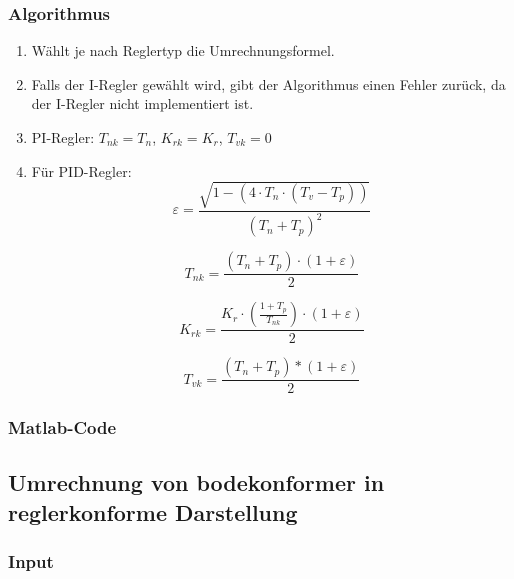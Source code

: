 \subsubsection*{Algorithmus}
\begin{enumerate}
    \item
        W\"ahlt je nach Reglertyp die Umrechnungsformel.
    \item
        Falls der I-Regler gew\"ahlt wird, gibt der Algorithmus einen Fehler zur\"uck, da der I-Regler nicht implementiert ist.
    \item
        PI-Regler:
        $T_{nk} = T_n$, $K_{rk} = K_r$, $T_{vk} = 0$
    \item
        F\"ur PID-Regler:
        \begin{equation*}
            \varepsilon =\frac{\sqrt{1-(4 \cdot T_n \cdot (T_v-T_p))}}{(T_n+T_p)^2}
        \end{equation*}

        \begin{equation*}
            T_{nk} = \frac{(T_n+T_p) \cdot (1+\varepsilon)}{2}
        \end{equation*}

        \begin{equation*}
            K_{rk} = \frac{K_r \cdot (\frac{1+T_p}{T_{nk}}) \cdot (1+\varepsilon)}{2}
        \end{equation*}

        \begin{equation*}
            T_{vk} = \frac{(T_n+T_p)*(1+\varepsilon)}{2}
        \end{equation*}
\end{enumerate}
\subsubsection*{Matlab-Code}



\subsection{Umrechnung von bodekonformer in reglerkonforme Darstellung}

\subsubsection*{Input}


